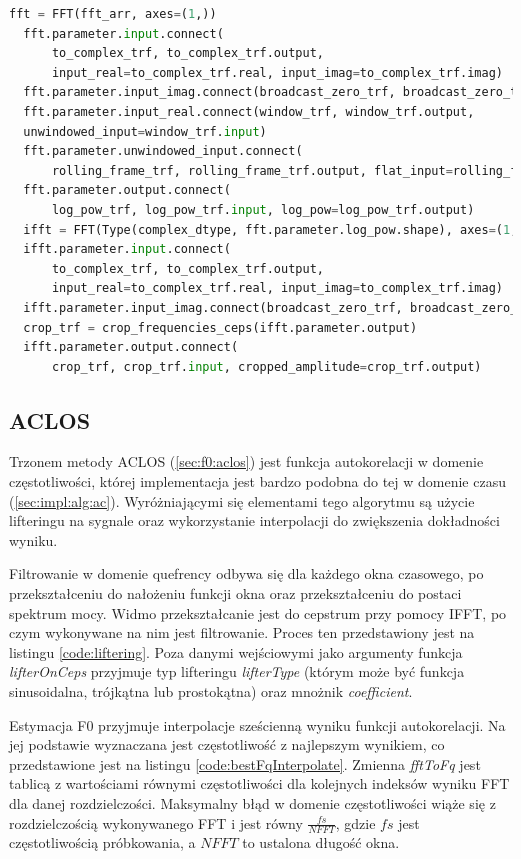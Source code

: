 \documentclass[12pt,a4paper,twoside]{mwart}
\begin{document}
\begin{lstlisting}[float, language=Python, caption={Proces wyliczania cepstrum przy użyciu GPU}, captionpos=b, label={code:cepsF0Gpu}]
  fft = FFT(fft_arr, axes=(1,))
  fft.parameter.input.connect(
      to_complex_trf, to_complex_trf.output,
      input_real=to_complex_trf.real, input_imag=to_complex_trf.imag)
  fft.parameter.input_imag.connect(broadcast_zero_trf, broadcast_zero_trf.output)
  fft.parameter.input_real.connect(window_trf, window_trf.output,
  unwindowed_input=window_trf.input)
  fft.parameter.unwindowed_input.connect(
      rolling_frame_trf, rolling_frame_trf.output, flat_input=rolling_frame_trf.input)
  fft.parameter.output.connect(
      log_pow_trf, log_pow_trf.input, log_pow=log_pow_trf.output)
  ifft = FFT(Type(complex_dtype, fft.parameter.log_pow.shape), axes=(1,))
  ifft.parameter.input.connect(
      to_complex_trf, to_complex_trf.output,
      input_real=to_complex_trf.real, input_imag=to_complex_trf.imag)
  ifft.parameter.input_imag.connect(broadcast_zero_trf, broadcast_zero_trf.output)
  crop_trf = crop_frequencies_ceps(ifft.parameter.output)
  ifft.parameter.output.connect(
      crop_trf, crop_trf.input, cropped_amplitude=crop_trf.output)
\end{lstlisting}

\subsection{ACLOS}\label{sec:impl:alg:aclos}
Trzonem metody ACLOS (\ref{sec:f0:aclos}) jest funkcja autokorelacji w domenie częstotliwości, której implementacja jest bardzo podobna do tej w domenie czasu (\ref{sec:impl:alg:ac}). Wyróżniającymi się elementami tego algorytmu są użycie lifteringu na sygnale oraz wykorzystanie interpolacji do zwiększenia dokładności wyniku.   

Filtrowanie w domenie quefrency odbywa się dla każdego okna czasowego, po przekształceniu do nałożeniu funkcji okna oraz przekształceniu do postaci spektrum mocy. Widmo przekształcanie jest do cepstrum przy pomocy IFFT, po czym wykonywane na nim jest filtrowanie. Proces ten przedstawiony jest na listingu \ref{code:liftering}. Poza danymi wejściowymi jako argumenty funkcja \textit{lifterOnCeps} przyjmuje typ lifteringu \textit{lifterType} (którym może być funkcja sinusoidalna, trójkątna lub prostokątna) oraz mnożnik \textit{coefficient}.

Estymacja F0 przyjmuje interpolacje sześcienną wyniku funkcji autokorelacji. Na jej podstawie wyznaczana jest częstotliwość z najlepszym wynikiem, co przedstawione jest na listingu \ref{code:bestFqInterpolate}. Zmienna \textit{fftToFq} jest tablicą z wartościami równymi częstotliwości dla kolejnych indeksów wyniku FFT dla danej rozdzielczości. Maksymalny błąd w domenie częstotliwości wiąże się z rozdzielczością wykonywanego FFT i jest równy $\frac{fs}{NFFT}$, gdzie $fs$ jest częstotliwością próbkowania, a $NFFT$ to ustalona długość okna. 
\end{document}
